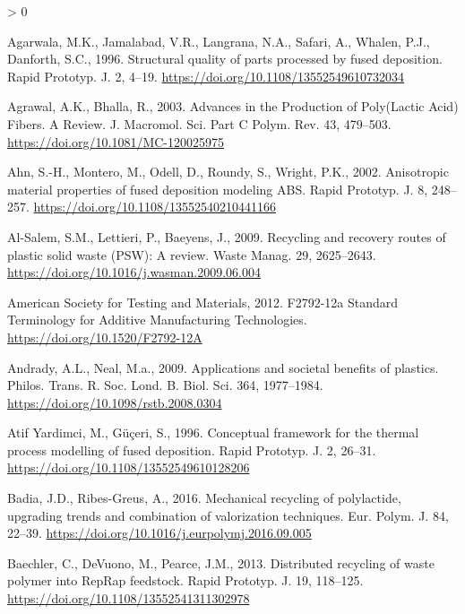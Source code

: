 \documentclass[
]{article}
\newlength{\cslhangindent}
\newenvironment{CSLReferences}[2] %
 {%
  \setlength{\parindent}{0pt}
  \ifodd #1 \everypar{\setlength{\hangindent}{\cslhangindent}}\ignorespaces\fi
  \ifnum #2 > 0
  \setlength{\parskip}{#2\baselineskip}
  \fi
 }%
 {}
\begin{document}
\hypertarget{refs}{}
\begin{CSLReferences}{1}{0}
\leavevmode\hypertarget{ref-Agarwala1996}{}%
Agarwala, M.K., Jamalabad, V.R., Langrana, N.A., Safari, A., Whalen, P.J., Danforth, S.C., 1996. {Structural quality of parts processed by fused deposition}. Rapid Prototyp. J. 2, 4--19. \url{https://doi.org/10.1108/13552549610732034}

\leavevmode\hypertarget{ref-Agrawal2003}{}%
Agrawal, A.K., Bhalla, R., 2003. {Advances in the Production of Poly(Lactic Acid) Fibers. A Review}. J. Macromol. Sci. Part C Polym. Rev. 43, 479--503. \url{https://doi.org/10.1081/MC-120025975}

\leavevmode\hypertarget{ref-Ahn2002}{}%
Ahn, S.-H., Montero, M., Odell, D., Roundy, S., Wright, P.K., 2002. {Anisotropic material properties of fused deposition modeling ABS}. Rapid Prototyp. J. 8, 248--257. \url{https://doi.org/10.1108/13552540210441166}

\leavevmode\hypertarget{ref-AlSalem2009}{}%
Al-Salem, S.M., Lettieri, P., Baeyens, J., 2009. {Recycling and recovery routes of plastic solid waste (PSW): A review}. Waste Manag. 29, 2625--2643. \url{https://doi.org/10.1016/j.wasman.2009.06.004}

\leavevmode\hypertarget{ref-ASTM2012}{}%
American Society for Testing and Materials, 2012. {F2792-12a Standard Terminology for Additive Manufacturing Technologies}. \url{https://doi.org/10.1520/F2792-12A}

\leavevmode\hypertarget{ref-Andrady2009}{}%
Andrady, A.L., Neal, M.a., 2009. {Applications and societal benefits of plastics.} Philos. Trans. R. Soc. Lond. B. Biol. Sci. 364, 1977--1984. \url{https://doi.org/10.1098/rstb.2008.0304}

\leavevmode\hypertarget{ref-AtifYardimci1996}{}%
Atif Yardimci, M., Güçeri, S., 1996. {Conceptual framework for the thermal process modelling of fused deposition}. Rapid Prototyp. J. 2, 26--31. \url{https://doi.org/10.1108/13552549610128206}

\leavevmode\hypertarget{ref-Badia2016}{}%
Badia, J.D., Ribes-Greus, A., 2016. {Mechanical recycling of polylactide, upgrading trends and combination of valorization techniques}. Eur. Polym. J. 84, 22--39. \url{https://doi.org/10.1016/j.eurpolymj.2016.09.005}

\leavevmode\hypertarget{ref-Baechler2013}{}%
Baechler, C., DeVuono, M., Pearce, J.M., 2013. {Distributed recycling of waste polymer into RepRap feedstock}. Rapid Prototyp. J. 19, 118--125. \url{https://doi.org/10.1108/13552541311302978}


\end{CSLReferences}
\end{document}
